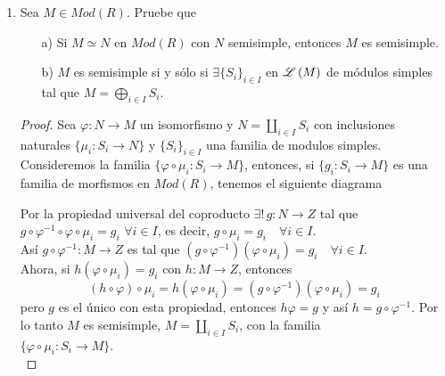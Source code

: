 \documentclass{article}
\begin{document}
\begin{enumerate}[label=\textbf{Ej \arabic*.}]
\begin{proof}
	, se tiene que $M \coprod N \in f.l.\lrprth{R}$, ya que $M,N$ tienen longitud finita. Más aún, dada una serie de composición $\mathfrak{F}$ para $M \coprod N$, el \textbf{Lema 2.1.1.b)} garantiza que 
	\begin{align*}
		l_{\mathfrak{F}}\lrprth{M \coprod N}=l_{f^{-1}\lrprth{\mathfrak{F}}}\lrprth{M}+l_{g\lrprth{\mathfrak{F}}}\lrprth{N}
	\end{align*}
	$\therefore l\lrprth{M \coprod N}=l\lrprth{M}+l\lrprth{N}$.
\end{proof}


\item Sea $M\in Mod(R)$. Pruebe que 
\begin{itemize}
\item[a)] Si $M\simeq N$ en $Mod(R)$ con $N$ semisimple, entonces $M$ es semisimple.

\item[b)] $M$ es semisimple si y sólo si $\exists\{S_i\}_{i\in I}$ en $\mathscr{L}\left(M\right)$ de módulos simples tal que $M=\displaystyle\bigoplus_{i\in I}S_i$.

\end{itemize}
\begin{proof}
 Sea $\varphi \colon N\longrightarrow M$ un isomorfismo y $N=\displaystyle\coprod_{i\in I}S_i$ con inclusiones naturales 
$\{\mu_i\colon S_i\longrightarrow N\}$ y $\{S_i\}_{i\in I}$ una familia de modulos simples.\\
Consideremos la familia $\{\varphi\circ \mu_i\colon S_i\longrightarrow M\}$, entonces, si $\{g_i\colon S_i\longrightarrow M\}$ es una 
familia de morfismos en $Mod(R)$, tenemos el siguiente diagrama

Por la propiedad universal del coproducto $\exists !\,g\colon N\longrightarrow Z$ tal que \\
$g\circ \varphi^{-1}\circ\varphi\circ \mu_i=g_i \,\, \forall i\in I$, es decir, $g\circ\mu_i=g_i\quad \forall i\in I$.\\
Así $g\circ \varphi^{-1}\colon M\longrightarrow Z$ es tal que $(g\circ \varphi^{-1})(\varphi\circ \mu_i)=g_i\quad \forall i\in I$.\\
Ahora, si $h(\varphi\circ \mu_i)=g_i$ con $h\colon M\longrightarrow Z$, entonces 
\[(h\circ\varphi)\circ \mu_i=h(\varphi\circ \mu_i)=(g\circ \varphi^{-1})(\varphi\circ \mu_i)=g_i\]
pero $g$ es el único con esta propiedad, entonces $h\varphi=g$ y así $h=g\circ \varphi^{-1}$. Por lo tanto $M$ es semisimple,
$M=\displaystyle\coprod_{i\in I}S_i$, con la familia\\ $\{\varphi\circ\mu_i\colon S_i\longrightarrow M\}$.\\


\end{proof}
\end{enumerate}
\end{document}
